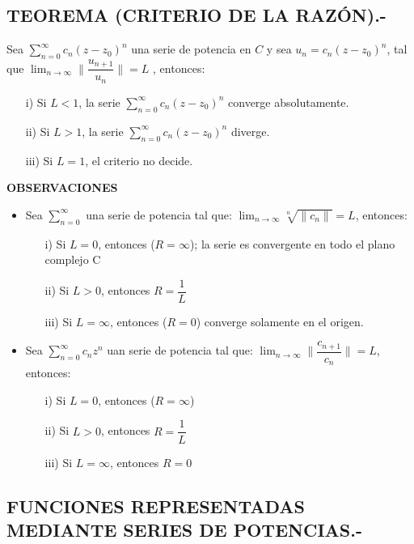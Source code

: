\documentclass[10pt,a4paper]{article}
\begin{document}
\subsection{TEOREMA (CRITERIO DE LA RAZÓN).-}
Sea $\displaystyle{\sum_{n = 0}^{\infty} c_n (z-z_0)^n}$ una serie de potencia en $C$ y sea $u_n = c_n (z-z_0)^n$, tal que $\displaystyle{\lim_{n \to \infty} \parallel \dfrac{u_{n+1}}{u_n}  \parallel = L }$ , entonces:
\begin{itemize}
\item[i)] Si $L<1$, la serie $\displaystyle{\sum_{n = 0}^{\infty} c_n (z-z_0)^n}$ converge absolutamente.
\item[ii)] Si $L>1$, la serie $\displaystyle{\sum_{n = 0}^{\infty} c_n (z-z_0)^n}$ diverge.
\item[iii)] Si $L=1$, el criterio no decide.
\end{itemize}
\textbf{OBSERVACIONES}
\begin{itemize}
\item Sea $\displaystyle{\sum_{n=0}^{\infty}}$ una serie de potencia tal que: $\displaystyle{\lim_{n \to \infty} \sqrt[n]{\parallel c_n \parallel} = L}$, entonces:
\begin{itemize}
\item[i)] Si $L=0$, entonces ($R= \infty$); la serie es convergente en todo el plano complejo C
\item[ii)] Si $L>0$, entonces $\displaystyle{R = \dfrac{1}{L}}$
\item[iii)] Si $L= \infty$, entonces ($R = 0$) converge solamente en el origen.
\end{itemize}
\item Sea $\displaystyle{\sum_{n=0}^{\infty} c_n z^n}$ uan serie de potencia tal que: $\displaystyle{\lim_{n \to \infty} \parallel \dfrac{c_{n+1}}{c_n} \parallel = L}$, entonces: 
\begin{itemize}
\item[i)] Si $L=0$, entonces ($R= \infty$)
\item[ii)] Si $L>0$, entonces $\displaystyle{R = \dfrac{1}{L}}$
\item[iii)] Si $L= \infty$, entonces $R = 0$
\end{itemize}
\end{itemize}
\subsection{FUNCIONES REPRESENTADAS MEDIANTE SERIES DE POTENCIAS.-}
\end{document}
